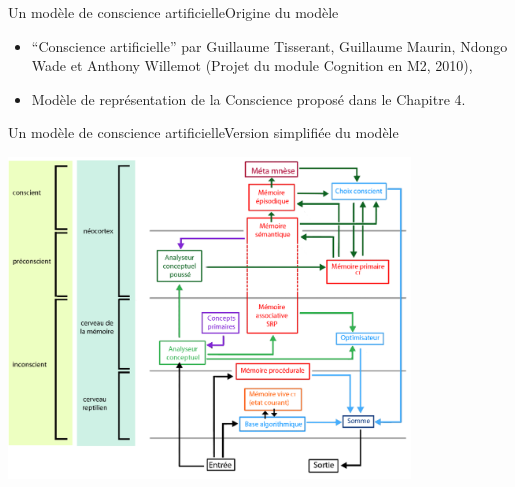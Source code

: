 \begin{frame}{Un modèle de conscience artificielle}{Origine du modèle}
\begin{itemize}
  \item \enquote{Conscience
  artificielle} par Guillaume Tisserant, Guillaume Maurin, Ndongo
  Wade et Anthony Willemot (Projet du module \og Cognition \fg{} en M2, 2010),
  \item Modèle de représentation de la Conscience proposé dans le Chapitre 4.
\end{itemize}
\end{frame}

\begin{frame}{Un modèle de conscience artificielle}{Version simplifiée du
modèle}
\begin{center}
\includegraphics[width=0.8\textwidth]{img/intro/modele_original}
\end{center}
\end{frame}

